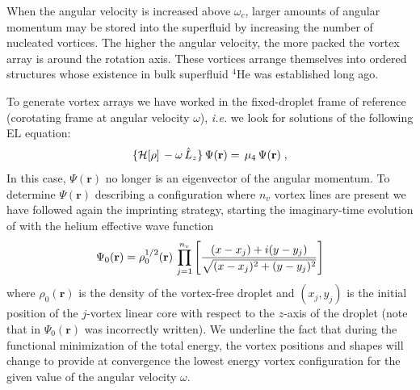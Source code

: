 When the angular velocity is increased 
above $\omega_c$, larger amounts of angular momentum may be stored
into the superfluid by increasing the number of 
nucleated vortices. The higher the angular velocity,  
the more packed the vortex array is
around the rotation axis.  
These vortices arrange themselves into ordered structures  
whose existence in bulk superfluid $^4$He was established long ago\citep{Vin61,Wil74}.

To generate vortex arrays we have worked in the  
fixed-droplet frame of reference (corotating frame at  
angular velocity $\omega$), {\it i.e.} we look for solutions of the following EL equation: 
%
\begin{equation}
\{{\cal H}[\rho] \,-\omega \,\hat{L}_z\} \,\Psi(\mathbf{r})  =  \,\mu_4 \,
\Psi(\mathbf{r}) \;,
\label{eq15}
\end{equation}
%
In this case, $\Psi(\mathbf{r})$ no longer is  
an eigenvector of the angular momentum.
To determine $\Psi(\mathbf{r})$ describing a 
configuration where $n_v$ vortex lines are present we have followed 
again the imprinting strategy, starting the imaginary-time evolution of  
 with the helium effective wave function
%
\begin{equation}
\Psi_0(\mathbf{r})=\rho_0^{1/2}(\mathbf{r})\, \prod _{j=1}^{n_v} \left[ {(x-x_j)+i (y-y_j) \over \sqrt{(x-x_j)^2+(y-y_j)^2}}  \right] 
\label{eq16}
\end{equation}
%
where  $\rho_0(\mathbf{r})$ is the density of the vortex-free 
droplet and $(x_j, y_j)$ is the initial position of the $j$-vortex linear  core with
respect to the $z$-axis of the droplet (note that in $\Psi_0(\mathbf{r})$ was incorrectly written).
We underline the fact that during the functional minimization 
of the total energy, the vortex positions and shapes will change
to provide at convergence the lowest energy vortex 
configuration for the given value of the angular velocity $\omega$.  

